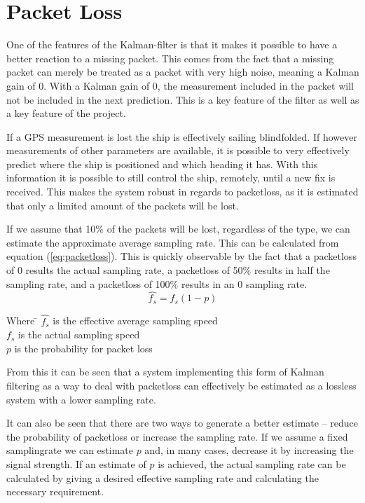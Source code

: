 \chapter{Packet Loss}
\label{chap:PacketLoss}

\noindent One of the features of the Kalman-filter is that it makes it possible to have a better reaction to a missing packet. This comes from the fact that a missing packet can merely be treated as a packet with very high noise, meaning a Kalman gain of 0. With a Kalman gain of 0, the measurement included in the packet will not be included in the next prediction. This is a key feature of the filter as well as a key feature of the project.

If a \ac{GPS} measurement is lost the ship is effectively sailing blindfolded. If however measurements of other parameters are available, it is possible to very effectively predict where the ship is positioned and which heading it has. With this information it is possible to still control the ship, remotely, until a new fix is received. This makes the system robust in regards to packetloss, as it is estimated that only a limited amount of the packets will be lost. 

If we assume that 10$\%$ of the packets will be lost, regardless of the type, we can estimate the approximate average sampling rate. This can be calculated from equation (\ref{eq:packetloss}). This is quickly observable by the fact that a packetloss of 0 results the actual sampling rate, a packetloss of 50$\%$ results in half the sampling rate, and a packetloss of 100$\%$ results in an 0 sampling rate.
\begin{equation}
\hat{f_s} = f_s(1-p)
\label{eq:packetloss}
\end{equation}

\begin{tabbing}
Where \= $\hat{f_s}$ is the effective average sampling speed\\
\> $f_s$ is the actual sampling speed\\
\> $p$ is the probability for packet loss
\end{tabbing}
From this it can be seen that a system implementing this form of Kalman filtering as a way to deal with packetloss can effectively be estimated as a lossless system with a lower sampling rate.

It can also be seen that there are two ways to generate a better estimate -- reduce the probability of packetloss or increase the sampling rate.
If we assume a fixed samplingrate we can estimate $p$ and, in many cases, decrease it by increasing the signal strength. If an estimate of $p$ is achieved, the actual sampling rate can be calculated by giving a desired effective sampling rate and calculating the necessary requirement.

